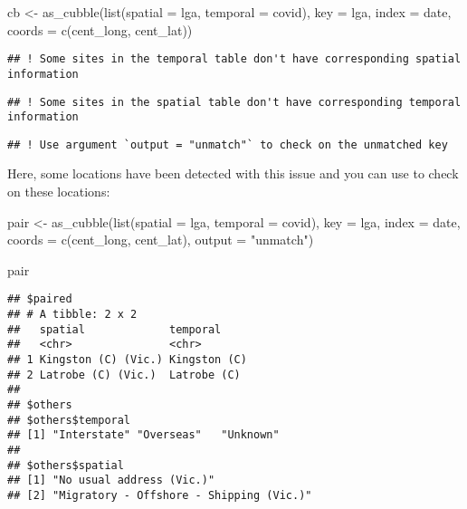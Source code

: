 \documentclass{article}
\newenvironment{Shaded}{\begin{snugshade}}{\end{snugshade}}
\newcommand{\AttributeTok}[1]{\textcolor[rgb]{0.77,0.63,0.00}{#1}}
\newcommand{\FunctionTok}[1]{\textcolor[rgb]{0.00,0.00,0.00}{#1}}
\newcommand{\NormalTok}[1]{#1}
\newcommand{\OtherTok}[1]{\textcolor[rgb]{0.56,0.35,0.01}{#1}}
\newcommand{\StringTok}[1]{\textcolor[rgb]{0.31,0.60,0.02}{#1}}
\begin{document}
\begin{Shaded}
\begin{Highlighting}[]
\NormalTok{cb }\OtherTok{\textless{}{-}} \FunctionTok{as\_cubble}\NormalTok{(}\FunctionTok{list}\NormalTok{(}\AttributeTok{spatial =}\NormalTok{ lga, }\AttributeTok{temporal =}\NormalTok{ covid),}
                \AttributeTok{key =}\NormalTok{ lga, }\AttributeTok{index =}\NormalTok{ date, }\AttributeTok{coords =} \FunctionTok{c}\NormalTok{(cent\_long, cent\_lat))}
\end{Highlighting}
\end{Shaded}

\begin{verbatim}
## ! Some sites in the temporal table don't have corresponding spatial information
\end{verbatim}

\begin{verbatim}
## ! Some sites in the spatial table don't have corresponding temporal information
\end{verbatim}

\begin{verbatim}
## ! Use argument `output = "unmatch"` to check on the unmatched key
\end{verbatim}

Here, some locations have been detected with this issue and you can use  to check on these locations:

\begin{Shaded}
\begin{Highlighting}[]
\NormalTok{pair }\OtherTok{\textless{}{-}} \FunctionTok{as\_cubble}\NormalTok{(}\FunctionTok{list}\NormalTok{(}\AttributeTok{spatial =}\NormalTok{ lga, }\AttributeTok{temporal =}\NormalTok{ covid),}
                  \AttributeTok{key =}\NormalTok{ lga, }\AttributeTok{index =}\NormalTok{ date, }\AttributeTok{coords =} \FunctionTok{c}\NormalTok{(cent\_long, cent\_lat),}
                  \AttributeTok{output =} \StringTok{"unmatch"}\NormalTok{)}

\NormalTok{pair}
\end{Highlighting}
\end{Shaded}

\begin{verbatim}
## $paired
## # A tibble: 2 x 2
##   spatial             temporal    
##   <chr>               <chr>       
## 1 Kingston (C) (Vic.) Kingston (C)
## 2 Latrobe (C) (Vic.)  Latrobe (C) 
## 
## $others
## $others$temporal
## [1] "Interstate" "Overseas"   "Unknown"   
## 
## $others$spatial
## [1] "No usual address (Vic.)"               
## [2] "Migratory - Offshore - Shipping (Vic.)"
\end{verbatim}
\end{document}
